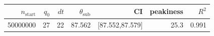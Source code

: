 \begin{tabular}{r r r r r r r}
\hline
$n_{\mathrm{start}}$ & $q_0$ & $dt$ & $\theta_{\mathrm{sub}}$ & CI & peakiness & $R^2$ \\
\hline
50000000 & 27 & 22 & 87.562 & [87.552,87.579] & 25.3 & 0.991 \\
\hline
\end{tabular}
